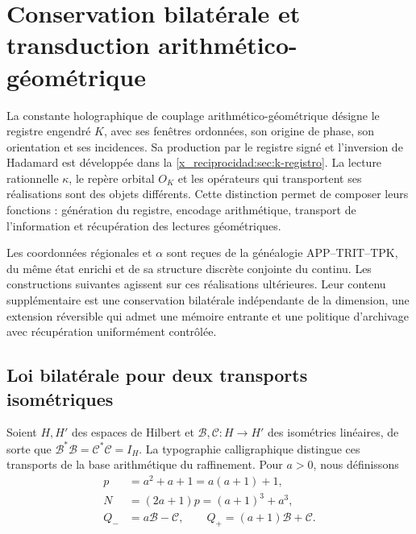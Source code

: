 \chapter{Conservation bilatérale et transduction arithmético-géométrique}
\label{x_reciprocidad:lib04:bilateral}

La constante holographique de couplage arithmético-géométrique désigne
le registre engendré \(K\), avec ses fenêtres ordonnées, son origine de phase,
son orientation et ses incidences. Sa production par le registre signé et
l’inversion de Hadamard est développée dans la \cref{x_reciprocidad:sec:k-registro}.
La lecture rationnelle \(\kappa\), le repère orbital \(O_K\) et les
opérateurs qui transportent ses réalisations sont des objets différents.
Cette distinction permet de composer leurs fonctions : génération du registre,
encodage arithmétique, transport de l’information et récupération des
lectures géométriques.

Les coordonnées régionales et \(\alpha\) sont reçues de la généalogie APP--TRIT--TPK, du même état enrichi et de sa structure discrète conjointe du continu. Les constructions suivantes agissent sur ces réalisations ultérieures. Leur contenu supplémentaire est une conservation bilatérale indépendante de la dimension, une extension réversible qui admet une mémoire entrante et une politique d'archivage avec récupération uniformément contrôlée.

\section{Loi bilatérale pour deux transports isométriques}
\label{x_reciprocidad:lib04:ley}

Soient \(H,H'\) des espaces de Hilbert et
\(\mathcal B,\mathcal C:H\to H'\) des isométries linéaires, de sorte que
\(\mathcal B^*\mathcal B=\mathcal C^*\mathcal C=I_H\).
La typographie calligraphique distingue ces transports de la base
arithmétique du raffinement. Pour \(a>0\), nous définissons
\begin{equation}
 \begin{aligned}
 p&=a^2+a+1=a(a+1)+1,\\
 N&=(2a+1)p=(a+1)^3+a^3,\\
 Q_-&=a\mathcal B-\mathcal C,\qquad
 Q_+=(a+1)\mathcal B+\mathcal C.
 \end{aligned}
 \label{x_reciprocidad:lib04:def-q}
\end{equation}

